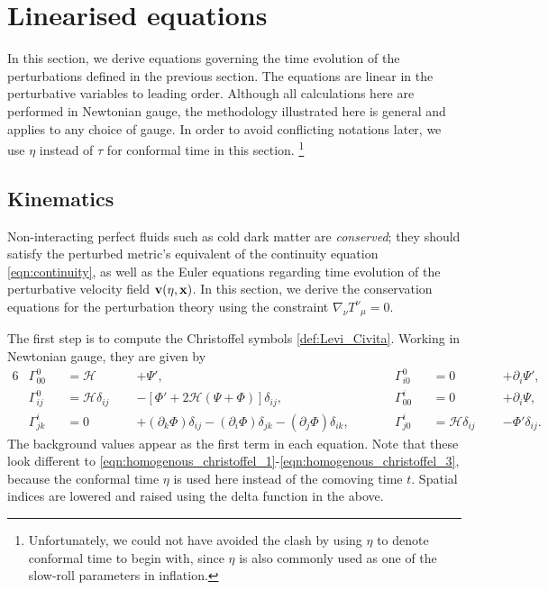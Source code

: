 \section{Linearised equations} \label{section:linearised_equations}

In this section, we derive equations governing the time evolution of the perturbations defined in the previous section. The equations are linear in the perturbative variables to leading order. Although all calculations here are performed in Newtonian gauge, the methodology illustrated here is general and applies to any choice of gauge. In order to avoid conflicting notations later, we use $\eta$ instead of $\tau$ for conformal time in this section. \footnote{Unfortunately, we could not have avoided the clash by using $\eta$ to denote conformal time to begin with, since $\eta$ is also commonly used as one of the slow-roll parameters in inflation.}

\subsection{Kinematics}

Non-interacting perfect fluids such as cold dark matter are \textit{conserved}; they should satisfy the perturbed metric's equivalent of the continuity equation \eqref{eqn:continuity}, as well as the Euler equations regarding time evolution of the perturbative velocity field $\mathbf{v}(\eta,\mathbf{x})$. In this section, we derive the conservation equations for the perturbation theory using the constraint $\nabla_\nu {T^\nu}_\mu = 0$.

The first step is to compute the Christoffel symbols \eqref{def:Levi_Civita}. Working in Newtonian gauge, they are given by
\begin{alignat}{6}
	&\Gamma^{0}_{00} &&= \mathcal{H} \;\;&&+ \Psi', \qquad &&\Gamma^{0}_{i0} &&= 0 \;\;&&+ \partial_i\Psi', \label{eqn:perturbed_christoffel_symbols_1}\\
	&\Gamma^{0}_{ij} &&= \mathcal{H}\delta_{ij} \;\;&&- \left[\Phi' + 2\mathcal{H}(\Psi+\Phi) \right]\delta_{ij}, \qquad &&\Gamma^{i}_{00} &&= 0 \;\;&&+ \partial_i\Psi, \label{eqn:perturbed_christoffel_symbols_2}\\
	&\Gamma^{i}_{jk} &&= 0 \;\;&&+ (\partial_k \Phi)\delta_{ij} - (\partial_i \Phi)\delta_{jk} - (\partial_j \Phi)\delta_{ik}, \qquad &&\Gamma^{i}_{j0} &&= \mathcal{H}\delta_{ij} \;\;&&- \Phi'\delta_{ij}. \label{eqn:perturbed_christoffel_symbols_3}
\end{alignat}
The background values appear as the first term in each equation. Note that these look different to \eqref{eqn:homogenous_christoffel_1}-\eqref{eqn:homogenous_christoffel_3}, because the conformal time $\eta$ is used here instead of the comoving time $t$. Spatial indices are lowered and raised using the delta function in the above.

